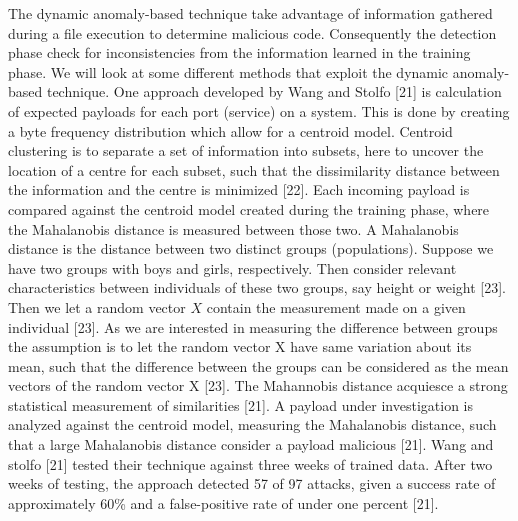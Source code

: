 \documentclass[12pt]{article} %
\begin{document}
The dynamic anomaly-based technique take advantage of information gathered during a file execution to determine malicious code. Consequently the detection phase check for inconsistencies from the information learned in the training phase. We will look at some different methods that exploit the dynamic anomaly-based technique. One approach developed by Wang and Stolfo [21] is calculation of expected payloads for each port (service) on a system. This is done by creating a byte frequency distribution which allow for a centroid model. Centroid clustering is to separate  a set of information into subsets, here to uncover the location of a centre for each subset, such that the dissimilarity distance between the information and the centre is minimized [22]. Each incoming payload is compared against the centroid model created during the training phase, where the Mahalanobis distance is measured between those two. A Mahalanobis distance is the distance between two distinct groups (populations). Suppose we have two groups with boys and girls, respectively. Then consider relevant characteristics between individuals of these two groups, say height or weight [23]. Then we let a random vector $X$ contain the measurement made on a given individual [23]. As we are interested in measuring the difference between groups the assumption is to let the random vector X have same variation about its mean, such that the difference between the groups can be considered as the mean vectors of the random vector X [23]. The Mahannobis distance acquiesce a strong statistical measurement of similarities [21]. A payload under investigation is analyzed against the centroid model, measuring the Mahalanobis distance, such that a large Mahalanobis distance consider a payload malicious [21]. Wang and stolfo [21] tested their technique against three weeks of trained data. After two weeks of testing, the approach detected 57 of 97 attacks, given a success rate of approximately 60\% and a false-positive rate of under one percent [21].
\end{document}
